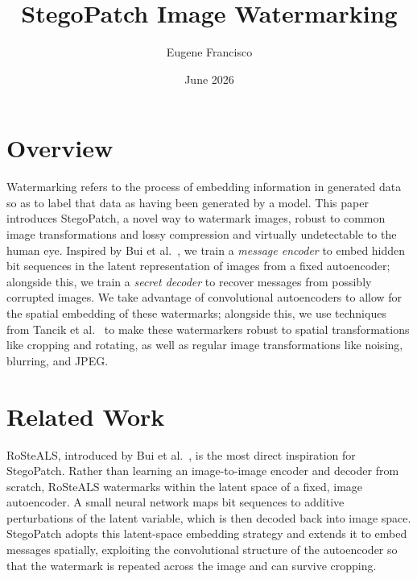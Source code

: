 \documentclass[twocolumn]{article}
\title{StegoPatch Image Watermarking}
\author{Eugene Francisco}
\date{June 2026}
\begin{document}
\maketitle

\section{Overview}

Watermarking refers to the process of embedding information in generated data so as to label that data as having been generated by a model. This paper introduces StegoPatch, a novel way to watermark images, robust to common image transformations and lossy compression and virtually undetectable to the human eye. Inspired by Bui et al.~\cite{bui2023rosteals}, we train a \textit{message encoder} to embed hidden bit sequences in the latent representation of images from a fixed autoencoder; alongside this, we train a \textit{secret decoder} to recover messages from possibly corrupted images. We take advantage of convolutional autoencoders to allow for the spatial embedding of these watermarks; alongside this, we use techniques from Tancik et al.~\cite{tancik2020stegastamp} to make these watermarkers robust to spatial transformations like cropping and rotating, as well as regular image transformations like noising, blurring, and JPEG.


\section{Related Work}
RoSteALS, introduced by Bui et al.~\cite{bui2023rosteals}, is the most direct inspiration for StegoPatch. Rather than learning an image-to-image encoder and decoder from scratch, RoSteALS watermarks within the latent space of a fixed, image autoencoder. A small neural network maps bit sequences to additive perturbations of the latent variable, which is then decoded back into image space. StegoPatch adopts this latent-space embedding strategy and extends it to embed messages spatially, exploiting the convolutional structure of the autoencoder so that the watermark is repeated across the image and can survive cropping.
\end{document}
